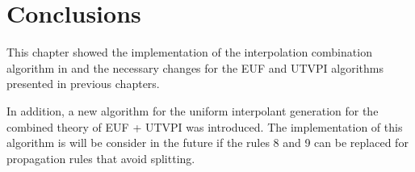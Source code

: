 \section{Conclusions}

This chapter showed the implementation of the
interpolation combination algorithm in 
\cite{10.1007/11532231_26} and the necessary
changes for the EUF and UTVPI algorithms
presented in previous chapters. 

In addition, a new algorithm for the uniform interpolant
generation for the combined theory of EUF + UTVPI 
was introduced. The implementation of this algorithm
is will be consider in the future if the rules 8 and 9
can be replaced for propagation rules that
avoid splitting.

